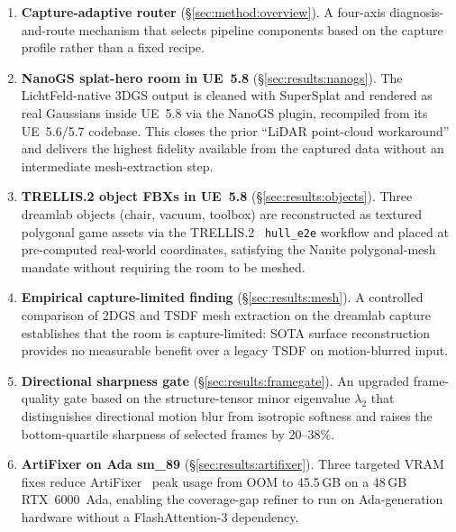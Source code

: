 \documentclass[a4paper,11pt]{report}
\begin{document}
\begin{enumerate}
  \item \textbf{Capture-adaptive router} (\S\ref{sec:method:overview}).  A
    four-axis diagnosis-and-route mechanism that selects pipeline components based
    on the capture profile rather than a fixed recipe.

  \item \textbf{NanoGS splat-hero room in UE~5.8}
    (\S\ref{sec:results:nanogs}).  The LichtFeld-native 3DGS output is cleaned with
    SuperSplat and rendered as real Gaussians inside UE~5.8 via the NanoGS plugin,
    recompiled from its UE~5.6/5.7 codebase.  This closes the prior ``LiDAR
    point-cloud workaround'' and delivers the highest fidelity available from the
    captured data without an intermediate mesh-extraction step.

  \item \textbf{TRELLIS.2 object FBXs in UE~5.8}
    (\S\ref{sec:results:objects}).  Three dreamlab objects (chair, vacuum,
    toolbox) are reconstructed as textured polygonal game assets via the
    TRELLIS.2~\cite{xiang2025_trellis2} \texttt{hull\_e2e} workflow and placed at
    pre-computed real-world coordinates, satisfying the Nanite polygonal-mesh
    mandate without requiring the room to be meshed.

  \item \textbf{Empirical capture-limited finding}
    (\S\ref{sec:results:mesh}).  A controlled comparison of 2DGS and TSDF
    mesh extraction on the dreamlab capture establishes that the room is
    capture-limited: SOTA surface reconstruction provides no measurable benefit
    over a legacy TSDF on motion-blurred input.

  \item \textbf{Directional sharpness gate}
    (\S\ref{sec:results:framegate}).  An upgraded frame-quality gate based on the
    structure-tensor minor eigenvalue $\lambda_2$ that distinguishes
    directional motion blur from isotropic softness and raises the bottom-quartile
    sharpness of selected frames by 20--38\%.

  \item \textbf{ArtiFixer on Ada sm\_89}
    (\S\ref{sec:results:artifixer}).  Three targeted VRAM fixes reduce
    ArtiFixer~\cite{delutio2026_artifixer} peak usage from OOM to 45.5\,GB on a
    48\,GB RTX~6000~Ada, enabling the coverage-gap refiner to run on Ada-generation
    hardware without a FlashAttention-3 dependency.
\end{enumerate}
\end{document}

